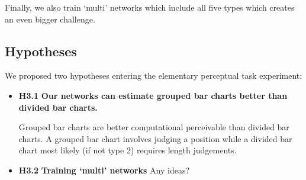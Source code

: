Finally, we also train `multi' networks which include all five types which creates an even bigger challenge.

\subsection{Hypotheses}

We proposed two hypotheses entering the elementary perceptual task experiment:

\begin{itemize}
	\item \textbf{H3.1} \textbf{Our networks can estimate grouped bar charts better than divided bar charts.} 
	
	Grouped bar charts are better computational perceivable than divided bar charts. A grouped bar chart involves judging a position while a divided bar chart most likely (if not type 2) requires length judgements. 
	
	\item \textbf{H3.2} \textbf{Training `multi' networks } Any ideas?
\end{itemize}


